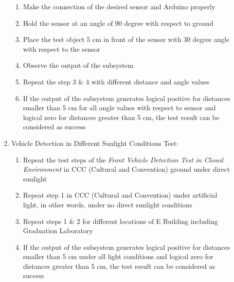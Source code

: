 \documentclass[a4paper,12pt]{article}
\begin{document}
\begin{enumerate}
\begin{enumerate}
\begin{enumerate}
\item Make the connection of the desired sensor and Arduino properly  

\item Hold the sensor at an angle of 90 degree with respect to ground  

\item Place the test object 5 cm in front of the sensor with 30 degree angle with respect to the sensor  

\item Observe the output of the subsystem  

\item Repeat the step 3 \& 4 with different distance and angle values  

\item If the output of the subsystem generates logical positive for distances smaller than 5 cm for all angle values with respect to sensor and logical zero for distances greater than 5 cm, the test result can be considered as success  

\end{enumerate}


\item Vehicle Detection in Different Sunlight Conditions Test:

\begin{enumerate}

\item Repeat the test steps of the \textit{Front Vehicle Detection Test in Closed Environment} in CCC (Cultural and Convention) ground under direct sunlight  

\item Repeat step 1 in CCC (Cultural and Convention) under artificial light, in other words, under no direct sunlight conditions  

\item Repeat steps 1 \& 2 for different locations of E Building including Graduation Laboratory  

\item If the output of the subsystem generates logical positive for distances smaller than 5 cm under all light conditions and logical zero for distances greater than 5 cm, the test result can be considered as success  

\end{enumerate}


\end{enumerate}







\end{enumerate}
\end{document}
